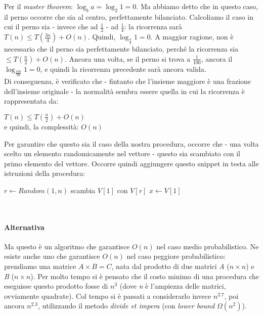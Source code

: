 Per il \textit{master theorem}: $\log_{b}{a} = \log_{2}{1} = 0$. Ma abbiamo detto che in questo caso, il perno occorre che sia al centro, perfettamente bilanciato. Calcoliamo il caso in cui il perno sia - invece che ad $\frac{1}{2}$ - ad $\frac{1}{4}$: la ricorrenza sarà $T(n) \leq T(\frac{3n}{4}) +O(n)$. Quindi, $\log_{\frac{4}{3}}{1} = 0$. A maggior ragione, non è necessario che il perno sia perfettamente bilanciato, perché la ricorrenza sia $\leq T(\frac{n}{2}) + O(n)$. Ancora una volta, se il perno si trova a $\frac{1}{100}$, ancora il $\log_{\frac{100}{99}}{1} = 0$, e quindi la ricorrenza precedente sarà ancora valida. \\
Di conseguenza, è verificato che - fintanto che l'insieme maggiore è una frazione dell'insieme originale - la normalità sembra essere quella in cui la ricorrenza è rappresentata da:
\begin{center}
	$T(n) \leq T(\frac{n}{2}) + O(n)$ \\
	e quindi, la complessità: $O(n)$
\end{center}
Per garantire che questo sia il caso della nostra procedura, occorre che - una volta scelto un elemento randomicamente nel vettore - questo sia scambiato con il primo elemento del vettore. Occorre quindi aggiungere questo snippet in testa alle istruzioni della procedura:
\begin{algorithm}
	\label{alg:KinVPatch}
	\begin{algorithmic}[1]
		\State $r \gets Random(1,n)$
		\State scambia $V[1]$ con $V[r]$
		\State $x \gets V[1]$
	\end{algorithmic}
\end{algorithm} \hfill \\

\paragraph{Alternativa}
Ma questo è un algoritmo che garantisce $O(n)$ nel caso medio probabilistico. Ne esiste anche uno che garantisce $O(n)$ nel caso peggiore probabilistico: prendiamo una matrice $A \times B = C$, nata dal prodotto di due matrici \textit{A} ($n \times n$) e \textit{B} ($n \times n$). Per molto tempo si è pensato che il costo minimo di una procedura che eseguisse questo prodotto fosse di $n^3$ (dove \textit{n} è l'ampiezza delle matrici, ovviamente quadrate). Col tempo si è passati a considerarlo invece $n^{2.7}$, poi ancora $n^{2.3}$, utilizzando il metodo \textit{divide et impera} (con \textit{lower bound $\Omega(n^2)$}).
\newpage

